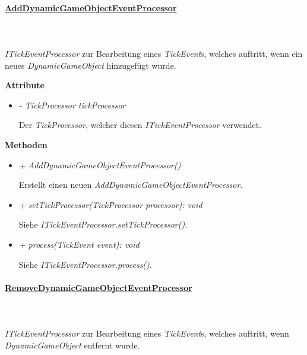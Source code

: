         \paragraph{\underline{AddDynamicGameObjectEventProcessor}} \mbox{}\\
        \\
        \textit{ITickEventProcessor} zur Bearbeitung eines \textit{TickEvent}s, welches auftritt, wenn ein neues \textit{DynamicGameObject} hinzugefügt wurde.\par

            \textbf{Attribute}
            \begin{itemize}
                \item  \textit{- TickProcessor tickProcessor}
                    \begin{leftbar}[0.9\linewidth]
                        Der \textit{TickProcessor}, welcher diesen \textit{ITickEventProcessor} verwendet.
                    \end{leftbar}
            \end{itemize}
            \textbf{Methoden}					
            \begin{itemize}
                \item  \textit{+ AddDynamicGameObjectEventProcessor()}
                    \begin{leftbar}[0.9\linewidth]
                        Erstellt einen neuen \textit{AddDynamicGameObjectEventProcessor}.
                    \end{leftbar}
                \item  \textit{+ setTickProcessor(TickProcessor processor): void}
                    \begin{leftbar}[0.9\linewidth]
                        Siehe \textit{ITickEventProcessor.setTickProcessor()}.
                    \end{leftbar}
                \item  \textit{+ process(TickEvent event): void}
                    \begin{leftbar}[0.9\linewidth]
                        Siehe \textit{ITickEventProcessor.process()}.
                    \end{leftbar}
            \end{itemize}

        \pagebreak
        \paragraph{\underline{RemoveDynamicGameObjectEventProcessor}} \mbox{}\\
        \\
        \textit{ITickEventProcessor} zur Bearbeitung eines \textit{TickEvent}s, welches auftritt, wenn \textit{DynamicGameObject} entfernt wurde.\par

